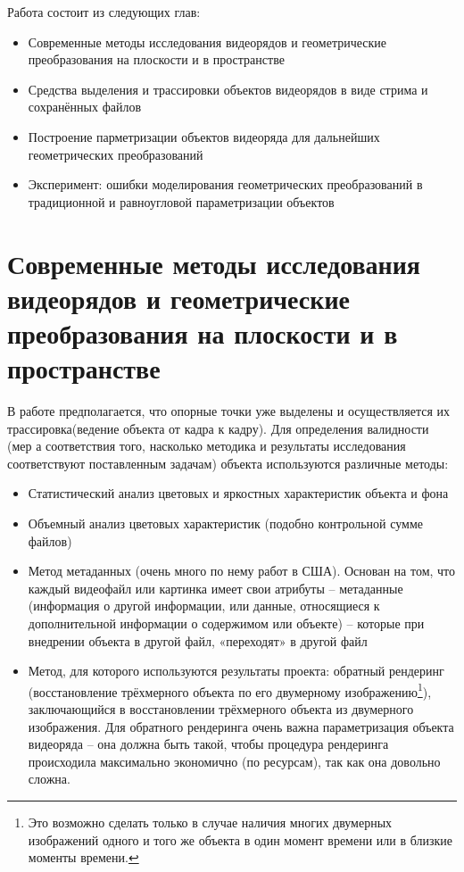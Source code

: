 \documentclass[]{article}
\begin{document}
	Работа состоит из следующих глав:
	\begin{itemize}[noitemsep]
		\item Современные методы исследования видеорядов и геометрические преобразования на плоскости и в пространстве
		\item Средства выделения и трассировки объектов видеорядов в виде стрима и сохранённых файлов
		\item Построение парметризации объектов видеоряда для дальнейших геометрических преобразований
		\item Эксперимент: ошибки моделирования геометрических преобразований в традиционной и равноугловой параметризации объектов 
	\end{itemize}
	
	\newpage
	\section{Современные методы исследования видеорядов и геометрические преобразования на плоскости и в пространстве}
	
	В работе предполагается, что опорные точки уже выделены и осуществляется их трассировка(ведение объекта от кадра к кадру). Для определения валидности (мер а соответствия того, насколько методика и результаты исследования соответствуют поставленным задачам) объекта используются различные методы: 
	\begin{itemize}[noitemsep]
		\item Статистический анализ цветовых и яркостных характеристик объекта и фона
		\item Объемный анализ цветовых характеристик (подобно контрольной сумме файлов)
		\item Метод метаданных (очень много по нему работ в США). Основан на том, что каждый видеофайл или картинка имеет свои атрибуты – метаданные (информация о другой информации, или данные, относящиеся к дополнительной информации о содержимом или объекте) – которые при внедрении объекта в другой файл, «переходят» в другой файл
		\item Метод, для которого используются результаты проекта: обратный рендеринг (восстановление трёхмерного объекта по его двумерному изображению\footnote{ Это возможно сделать только в случае наличия многих двумерных изображений одного и того же объекта в один момент времени или в близкие моменты времени.
		}), заключающийся в восстановлении трёхмерного объекта из двумерного изображения. Для обратного рендеринга очень важна параметризация объекта видеоряда – она должна быть такой, чтобы процедура рендеринга происходила максимально экономично (по ресурсам), так как она довольно сложна. 
	\end{itemize}
	
\end{document}
